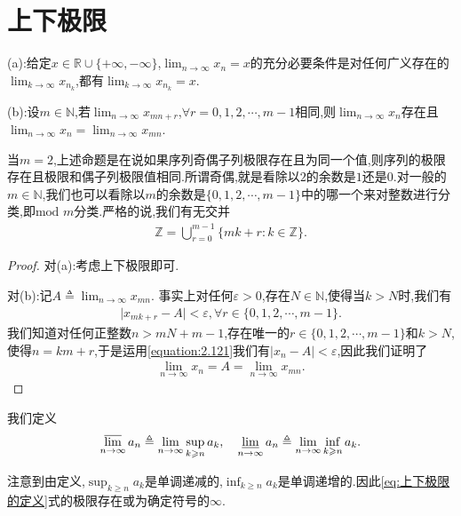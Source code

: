 \documentclass[../../main.tex]{subfiles}%
\begin{document}
\section{上下极限}

\begin{proposition}[子列极限命题]\label{proposition:子列极限命题}
(a):给定\(x \in \mathbb{R} \cup \{+\infty, -\infty\}\),\(\lim_{n \to \infty} x_n = x\)的充分必要条件是对任何广义存在的\(\lim_{k \to \infty} x_{n_k}\),都有\(\lim_{k \to \infty} x_{n_k} = x\).

(b):设\(m \in \mathbb{N}\),若\(\lim_{n \to \infty} x_{mn + r}\),\(\forall r = 0,1,2,\cdots,m - 1\)相同,则\(\lim_{n \to \infty} x_n\)存在且
\(\lim_{n \to \infty} x_n = \lim_{n \to \infty} x_{mn}\).
\end{proposition}
\begin{note}
当\(m = 2\),上述命题是在说如果序列奇偶子列极限存在且为同一个值,则序列的极限存在且极限和偶子列极限值相同.所谓奇偶,就是看除以\(2\)的余数是\(1\)还是\(0\).对一般的\(m \in \mathbb{N}\),我们也可以看除以\(m\)的余数是\(\{0,1,2,\cdots,m - 1\}\)中的哪一个来对整数进行分类,即\(\text{mod } m\)分类.严格的说,我们有无交并
\begin{align*}
\mathbb{Z} = \bigcup_{r = 0}^{m - 1} \{mk + r : k \in \mathbb{Z}\}.
\end{align*}
\end{note}
\begin{proof}

对(a):考虑上下极限即可.

对(b):记\(A \triangleq \lim_{n \to \infty} x_{mn}\).
事实上对任何\(\varepsilon > 0\),存在\(N \in \mathbb{N}\),使得当\(k > N\)时,我们有
\begin{align}\label{equation:2.121}
\vert x_{mk + r} - A \vert < \varepsilon, \forall r \in \{0,1,2,\cdots,m - 1\}.
\end{align}
我们知道对任何正整数\(n > mN + m - 1\),存在唯一的\(r \in \{0,1,2,\cdots,m - 1\}\)和\(k > N\),使得\(n = km + r\),于是运用\eqref{equation:2.121}我们有\(\vert x_n - A \vert < \varepsilon\),因此我们证明了
\begin{align*}
\lim_{n \to \infty} x_n = A = \lim_{n \to \infty} x_{mn} .
\end{align*}
\end{proof}

\begin{definition}[上下极限的定义]\label{theorem:上下极限的定义}
我们定义
\begin{align}\label{eq:上下极限的定义}
\varlimsup_{n \to \infty} a_n \triangleq \lim_{n \to \infty} \sup_{k \geqslant  n} a_k, \quad \varliminf_{n \to \infty} a_n \triangleq \lim_{n \to \infty} \inf_{k \geqslant  n} a_k. 
\end{align}
\end{definition}
\begin{note}
注意到由定义,\(\sup_{k \geqslant  n} a_k\)是单调递减的,\(\inf_{k \geqslant  n} a_k\)是单调递增的.因此\eqref{eq:上下极限的定义}式的极限存在或为确定符号的\(\infty\).
\end{note}
\end{document}
